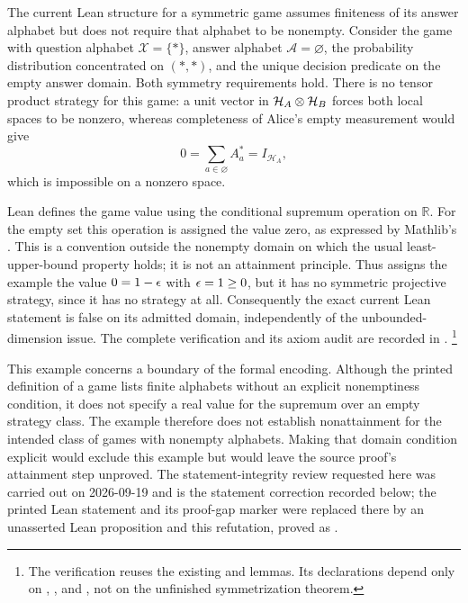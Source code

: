 \documentclass[11pt]{article}
\begin{document}
The current Lean structure for a symmetric game assumes finiteness of its
answer alphabet but does not require that alphabet to be nonempty.  Consider
the game with question alphabet $\mathcal X=\{*\}$, answer alphabet
$\mathcal A=\varnothing$, the probability distribution concentrated on
$(*,*)$, and the unique decision predicate on the empty answer domain.
Both symmetry requirements hold.  There is no tensor product strategy for
this game: a unit vector in $\mathcal H_A\otimes\mathcal H_B$ forces both local
spaces to be nonzero, whereas completeness of Alice's empty measurement
would give
\[
  0=\sum_{a\in\varnothing} A^*_a=I_{\mathcal H_A},
\]
which is impossible on a nonzero space.

Lean defines the game value using the conditional supremum operation on
$\mathbb R$.  For the empty set this operation is assigned the value zero,
as expressed by Mathlib's .  This is a convention
outside the nonempty domain on which the usual least-upper-bound property
holds; it is not an attainment principle.  Thus  assigns
the example the value $0=1-\epsilon$ with $\epsilon=1\geq0$, but it has no symmetric
projective strategy, since it has no strategy at all.  Consequently the exact
current Lean statement is false on its admitted domain, independently of the
unbounded-dimension issue.  The complete verification and its axiom audit are
recorded in .%
\footnote{The verification reuses the existing
 and
 lemmas.  Its declarations depend only
on , , and ,
not on the unfinished symmetrization theorem.}

This example concerns a boundary of the formal encoding.  Although the
printed definition of a game lists finite alphabets without an explicit
nonemptiness condition, it does not specify a real value for the supremum
over an empty strategy class.  The example therefore does not establish
nonattainment for the intended class of games with nonempty alphabets.
Making that domain condition explicit would exclude this example but would
leave the source proof's attainment step unproved.  The statement-integrity
review requested here was carried out on 2026-09-19 and is the statement
correction recorded below; the printed Lean statement and its proof-gap marker
were replaced there by an unasserted Lean proposition and this refutation,
proved as .
\end{document}
